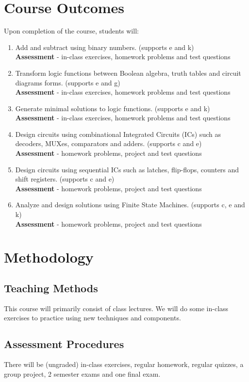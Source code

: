 \documentclass{article}
\begin{document}
\section{Course Outcomes}
Upon completion of the course, students will:
\begin{enumerate}
  \item Add and subtract using binary numbers. (supports e and k)\\
  \textbf{Assessment} - in-class exercises, homework problems and test questions
  \item Transform logic functions between Boolean algebra, truth tables and circuit diagrams forms. (supports e and g) \\
  \textbf{Assessment} - in-class exercises, homework problems and test questions
  \item Generate minimal solutions to logic functions.  (supports e and k) \\
  \textbf{Assessment} - in-class exercises, homework problems and test questions
  \item Design circuits using combinational Integrated Circuits (ICs) such as decoders, MUXes, comparators and adders.  (supports c and e) \\
  \textbf{Assessment} - homework problems, project and test questions
  \item Design circuits using sequential ICs such as latches, flip-flops, counters and shift registers. (supports c and e) \\
  \textbf{Assessment} - homework problems, project and test questions
  \item Analyze and design solutions using Finite State Machines. (supports c, e and k) \\
  \textbf{Assessment} - homework problems, project and test questions
\end{enumerate}
\section{Methodology}
\subsection{Teaching Methods}
This course will primarily consist of class lectures.  We will do some in-class exercises to practice using new techniques and components.

\subsection{Assessment Procedures}
There will be (ungraded) in-class exercises, regular homework, regular quizzes, a group project, 2 semester exams and one final exam.
\end{document}
